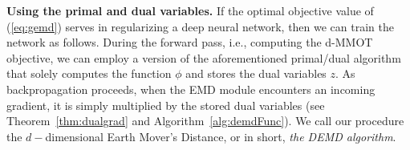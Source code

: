 
{\bf Using the primal and dual variables.}  If the optimal objective value of (\ref{eq:gemd}) serves in regularizing a deep neural network, then we can train the network as follows. %
During the forward pass, i.e., computing the d-MMOT objective, we can employ a version of the aforementioned primal/dual algorithm that solely computes the function $\phi$ and stores the dual variables $z$.
As backpropagation proceeds, when the EMD module encounters an incoming gradient, it is simply multiplied by the stored dual variables (see Theorem~\ref{thm:dualgrad} and Algorithm~\ref{alg:demdFunc}). We call our procedure the $d-$dimensional Earth Mover's Distance, or in short,\textit{ the DEMD algorithm}. 

